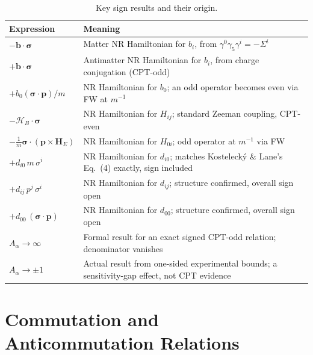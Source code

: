 \documentclass[main]{subfiles}
\begin{document}
\begin{table}[h]
\centering
\small
\begin{tabular}{@{}l>{\raggedright\arraybackslash}p{6.5cm}@{}}
\toprule
Expression & Meaning \\
\midrule
$-\mathbf b\cdot\boldsymbol\sigma$ & Matter NR Hamiltonian for $b_i$, from $\gamma^0\gamma_5\gamma^i=-\Sigma^i$ \\
$+\mathbf b\cdot\boldsymbol\sigma$ & Antimatter NR Hamiltonian for $b_i$, from charge conjugation (CPT-odd) \\
$+b_0(\boldsymbol\sigma\cdot\mathbf p)/m$ & NR Hamiltonian for $b_0$; an odd operator becomes even via FW at $m^{-1}$ \\
$-\boldsymbol{\mathcal H}_B\cdot\boldsymbol\sigma$ & NR Hamiltonian for $H_{ij}$; standard Zeeman coupling, CPT-even \\
$-\tfrac1m\boldsymbol\sigma\cdot(\mathbf p\times\mathbf H_E)$ & NR Hamiltonian for $H_{0i}$; odd operator at $m^{-1}$ via FW \\
$+d_{i0}\,m\,\sigma^i$ & NR Hamiltonian for $d_{i0}$; matches Kostelecký \& Lane's Eq.~(4) exactly, sign included \\
$+d_{ij}\,p^j\,\sigma^i$ & NR Hamiltonian for $d_{ij}$; structure confirmed, overall sign open \\
$+d_{00}\,(\boldsymbol\sigma\cdot\mathbf p)$ & NR Hamiltonian for $d_{00}$; structure confirmed, overall sign open \\
$A_\alpha\to\infty$ & Formal result for an exact signed CPT-odd relation; denominator vanishes \\
$A_\alpha\to\pm1$ & Actual result from one-sided experimental bounds; a sensitivity-gap effect, not CPT evidence \\
\bottomrule
\end{tabular}
\caption{Key sign results and their origin.}
\label{tab:app-signs}
\end{table}

\section{Commutation and Anticommutation Relations}
\end{document}
